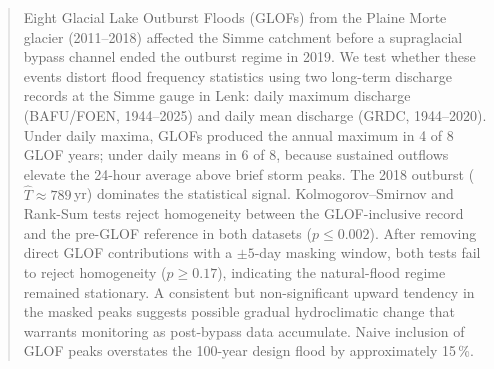 \begin{abstract}
\noindent
Eight Glacial Lake Outburst Floods (GLOFs) from the Plaine Morte glacier (2011--2018)
affected the Simme catchment before a supraglacial bypass channel ended the outburst
regime in 2019. We test whether these events distort flood frequency statistics using
two long-term discharge records at the Simme gauge in Lenk: daily maximum discharge
(BAFU/FOEN, 1944--2025) and daily mean discharge (GRDC, 1944--2020). Under daily
maxima, GLOFs produced the annual maximum in 4 of 8 GLOF years; under daily means in
6 of 8, because sustained outflows elevate the 24-hour average above brief storm peaks.
The 2018 outburst ($\hat{T} \approx 789$\,yr) dominates the statistical signal.
Kolmogorov--Smirnov and Rank-Sum tests reject homogeneity between the GLOF-inclusive
record and the pre-GLOF reference in both datasets ($p \leq 0.002$). After removing
direct GLOF contributions with a $\pm 5$-day masking window, both tests fail to reject
homogeneity ($p \geq 0.17$), indicating the natural-flood regime remained stationary.
A consistent but non-significant upward tendency in the masked peaks suggests possible
gradual hydroclimatic change that warrants monitoring as post-bypass data accumulate.
Naive inclusion of GLOF peaks overstates the 100-year design flood by approximately
15\,\%.
\end{abstract}
